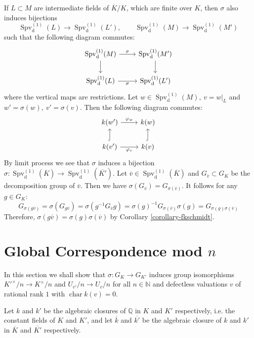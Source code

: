 \begin{remark}\label{3.3}
If $L\subset M$ are intermediate fields of $\overline{K}/K$, which are finite over $K$, then $\sigma$ also induces bijections
\[ \operatorname{Spv}_\text{d}^{(1)}(L) \to \operatorname{Spv}_\text{d}^{(1)}(L'),\qquad \operatorname{Spv}_\text{d}^{(1)}(M) \to \operatorname{Spv}_\text{d}^{(1)}(M') \]
such that the following diagram commutes:
\[\begin{tikzcd}
\operatorname{Spv}_\text{d}^{(1)}(M) \rar["\sigma"]\dar & \operatorname{Spv}_\text{d}^{(1)}(M')\dar\\
\operatorname{Spv}_\text{d}^{(1)}(L) \rar["\sigma"'] & \operatorname{Spv}_\text{d}^{(1)}(L')
\end{tikzcd}\]
where the vertical maps are restrictions. Let $w\in\operatorname{Spv}_\text{d}^{(1)}(M),\ v=w|_L$ and $w'=\sigma(w),\ v'=\sigma(v)$. Then the following diagram commutes:
\[ \begin{tikzcd}
k(w') \rar["\varphi_w"] & k(w)\\
k(v') \rar["\varphi_v"']\uar[hook] & k(v)\uar[hook]
\end{tikzcd} \]
By limit process we see that $\sigma$ induces a bijection $\sigma: \operatorname{Spv}_\text{d}^{(1)}(\overline{K})\to \operatorname{Spv}_\text{d}^{(1)}(\overline{K'})$. Let $\overline{v}\in \operatorname{Spv}_\text{d}^{(1)}(\overline{K})$ and $G_{\overline{v}}\subset G_K$ be the decomposition group of $\overline{v}$. Then we have $\sigma(G_{\overline{v}}) = G_{\sigma(\overline{v})}$. It follows for any $g\in G_K$:
\[G_{\sigma(g\overline{v})} = \sigma(G_{g\overline{v}}) = \sigma(g^{-1} G_{\overline{v}}g) = \sigma(g)^{-1} G_{\sigma(\overline{v})}\sigma(g) = G_{\sigma(g)\sigma(\overline{v})}\]
Therefore, $\sigma(g\overline{v})=\sigma(g)\sigma(\overline{v})$ by Corollary \ref{corollary-fkschmidt}.
\end{remark}

\section{Global Correspondence mod \texorpdfstring{$n$}{n}}

In this section we shall show that $\sigma: G_K\to G_{K'}$ induces group isomorphisms $K'^\times/n\to K^\times/n$ and $U_{v'}/n\to U_v/n$ for all $n\in\mathbb{N}$ and defectless valuations $v$ of rational rank $1$ with $\operatorname{char}k(v) =0$.

Let $k$ and $k'$ be the algebraic closures of $\mathbb{Q}$ in $K$ and $K'$ respectively, i.e. the constant fields of $K$ and $K'$, and let $\overline{k}$ and $\overline{k'}$ be the algebraic closure of $k$ and $k'$ in $\overline{K}$ and $\overline{K'}$ respectively.

